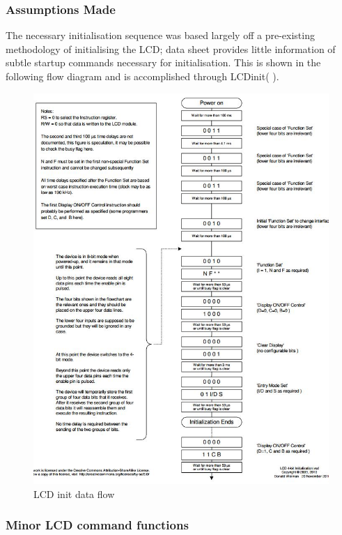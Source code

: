 \documentclass{article}
\begin{document}
\subsubsection{Assumptions Made}
The necessary initialisation sequence was based largely off a pre-existing methodology of initialising the LCD; data sheet provides little information of subtle startup commands necessary for initialisation. This is shown in the following flow diagram and is accomplished through LCD\textunderscore init( ).


\begin{figure}[H]
	\vspace*{-2cm}
	\centerline{\includegraphics[scale=0.8]{LCDinit.jpg}}
	\centering
	\caption{LCD init data flow}
\end{figure}

\subsubsection{Minor LCD command functions}
\end{document}
